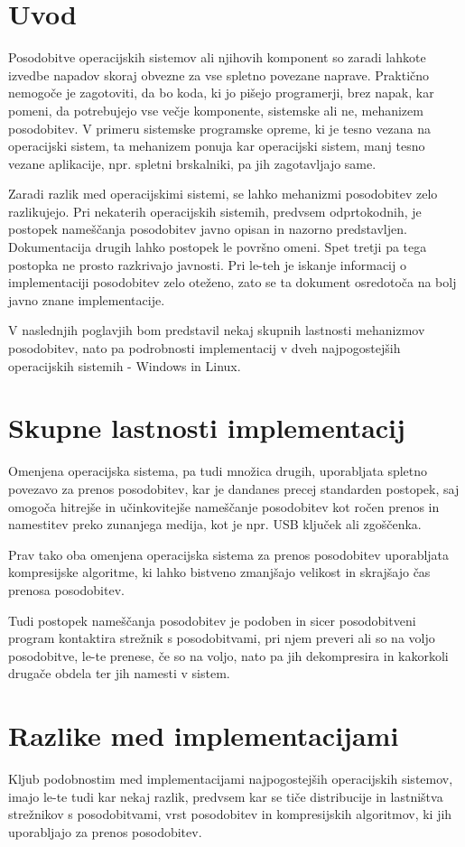 \section{Uvod}

Posodobitve operacijskih sistemov ali njihovih komponent so zaradi lahkote izvedbe napadov skoraj obvezne za vse
spletno povezane naprave.
Praktično nemogoče je zagotoviti, da bo koda, ki jo pišejo programerji, brez napak, kar pomeni, da potrebujejo
vse večje komponente, sistemske ali ne, mehanizem posodobitev.
V primeru sistemske programske opreme, ki je tesno vezana na operacijski sistem, ta mehanizem ponuja kar operacijski
sistem, manj tesno vezane aplikacije, npr. spletni brskalniki, pa jih zagotavljajo same.

Zaradi razlik med operacijskimi sistemi, se lahko mehanizmi posodobitev zelo razlikujejo.
Pri nekaterih operacijskih sistemih, predvsem odprtokodnih, je postopek nameščanja posodobitev javno opisan in
nazorno predstavljen.
Dokumentacija drugih lahko postopek le površno omeni.
Spet tretji pa tega postopka ne prosto razkrivajo javnosti.
Pri le-teh je iskanje informacij o implementaciji posodobitev zelo oteženo, zato se ta dokument osredotoča na bolj
javno znane implementacije.

V naslednjih poglavjih bom predstavil nekaj skupnih lastnosti mehanizmov posodobitev, nato pa podrobnosti
implementacij v dveh najpogostejših operacijskih sistemih - Windows in Linux.

\section{Skupne lastnosti implementacij}

Omenjena operacijska sistema, pa tudi množica drugih, uporabljata spletno povezavo za prenos posodobitev,
kar je dandanes precej standarden postopek, saj omogoča hitrejše in učinkovitejše nameščanje posodobitev
kot ročen prenos in namestitev preko zunanjega medija, kot je npr. USB ključek ali zgoščenka.

Prav tako oba omenjena operacijska sistema za prenos posodobitev uporabljata kompresijske algoritme,
ki lahko bistveno zmanjšajo velikost in skrajšajo čas prenosa posodobitev.

Tudi postopek nameščanja posodobitev je podoben in sicer posodobitveni program kontaktira strežnik s posodobitvami,
pri njem preveri ali so na voljo posodobitve, le-te prenese, če so na voljo, nato pa jih dekompresira in
kakorkoli drugače obdela ter jih namesti v sistem.

\section{Razlike med implementacijami}

Kljub podobnostim med implementacijami najpogostejših operacijskih sistemov, imajo le-te tudi kar nekaj razlik,
predvsem kar se tiče distribucije in lastništva strežnikov s posodobitvami, vrst posodobitev in kompresijskih
algoritmov, ki jih uporabljajo za prenos posodobitev.